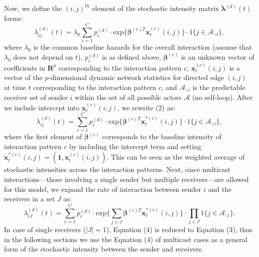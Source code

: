 \documentclass[a4paper]{article}
\begin{document}
Now, we define the $(i, j)^{th}$ element of the stochastic intensity matrix $\boldsymbol{\lambda}^{(d)}(t)$ forms:
\begin{equation}
\lambda^{(d)}_{ij}(t)=\lambda_0\sum\limits_{c=1}^{C} p^{(d)}_c\cdot \mbox{exp}\Big\{\boldsymbol{\beta}^{(c)T}\boldsymbol{x}^{(c)}_t(i, j)\Big\}\cdot 1\{j \in \mathcal{A}_{\backslash i}\},
\end{equation}
where $\lambda_0$ is the common baseline hazards for the overall interaction (assume that $\lambda_0$ does not depend on $t$), $p_c^{(d)}$ is as defined above, $\boldsymbol{\beta}^{(c)}$ is an unknown vector of coefficients in $\boldsymbol{R}^{p}$ corresponding to the interaction pattern $c$, $\boldsymbol{x}^{(c)}_t(i, j)$ is a vector of the $p$-dimensional dynamic network statistics for directed edge $(i, j)$ at time $t$ corresponding to the interaction pattern $c$, and $\mathcal{A}_{\backslash i}$ is the predictable receiver set of sender $i$ within the set of all possible actors $\mathcal{A}$ (no self-loop). After we include intercept into $\boldsymbol{x}^{(c)}_t(i, j)$, we rewrite (2) as: 
\begin{equation}
\lambda^{(d)}_{ij}(t)= \sum\limits_{c=1}^{C} p^{(d)}_c\cdot\mbox{exp}\Big\{\boldsymbol{\beta}^{(c)T}\boldsymbol{x}^{*(c)}_t(i, j)\Big\}\cdot 1\{j \in \mathcal{A}_{\backslash i}\},
\end{equation}
where the first element of $\boldsymbol{\beta}^{(c)}$ corresponds to the baseline intensity of interaction pattern $c$ by including the intercept term and setting $\boldsymbol{x}^{*(c)}_t(i, j)=(\boldsymbol{1}, \boldsymbol{x}^{(c)}_t(i, j))$. This can be seen as the weighted average of stochastic intensities across the interaction patterns. Next, since multicast interactions—those involving a single sender but multiple
receivers—are allowed for this model, we expand the rate of interaction between sender $i$ and the receivers in a set $J$ as:
\begin{equation}
\lambda^{(d)}_{iJ}(t)= \sum\limits_{c=1}^{C} p^{(d)}_c\cdot\mbox{exp}\Big\{\sum\limits_{j \in J} \boldsymbol{\beta}^{(c)T}\boldsymbol{x}^{*(c)}_t(i, j)\Big\}\cdot \prod\limits_{j \in J}1\{j \in \mathcal{A}_{\backslash i}\}.
\end{equation}
In case of single receivers ($|J|=1$),  Equation (4) is reduced to Equation (3), thus in the following sections we use the Equation (4) of multicast cases as a general form of the stochastic intensity between the sender and receivers.
\end{document}
